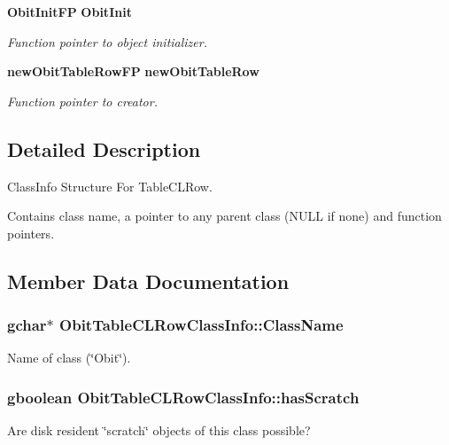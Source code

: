 \begin{CompactItemize}
{\bf Obit\-Init\-FP} {\bf Obit\-Init}
\begin{CompactList}\small\item\em Function pointer to object initializer. \item\end{CompactList}\item 
{\bf new\-Obit\-Table\-Row\-FP} {\bf new\-Obit\-Table\-Row}
\begin{CompactList}\small\item\em Function pointer to creator. \item\end{CompactList}\end{CompactItemize}


\subsection{Detailed Description}
Class\-Info Structure For Table\-CLRow. 

Contains class name, a pointer to any parent class (NULL if none) and function pointers. 



\subsection{Member Data Documentation}
\subsubsection{\setlength{\rightskip}{0pt plus 5cm}gchar$\ast$ {\bf Obit\-Table\-CLRow\-Class\-Info::Class\-Name}}\label{structObitTableCLRowClassInfo_o2}


Name of class (\char`\"{}Obit\char`\"{}). 

\subsubsection{\setlength{\rightskip}{0pt plus 5cm}gboolean {\bf Obit\-Table\-CLRow\-Class\-Info::has\-Scratch}}\label{structObitTableCLRowClassInfo_o1}


Are disk resident \char`\"{}scratch\char`\"{} objects of this class possible? 

